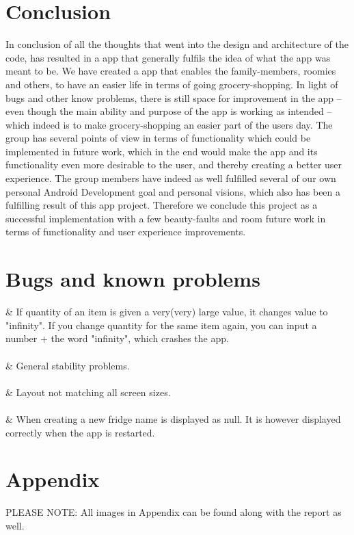 \documentclass[12pt]{article}
\begin{document}
\section{Conclusion}
In conclusion of all the thoughts that went into the design and architecture of the code, has resulted in a app that generally fulfils the idea of what the app was meant to be. We have created a app that enables the family-members, roomies and others, to have an easier life in terms of going grocery-shopping. In light of bugs and other know problems, there is still space for improvement in the app – even though the main ability and purpose of the app is working as intended – which indeed is to make grocery-shopping an easier part of the users day. The group has several points of view in terms of functionality which could be implemented in future work, which in the end would make the app and its functionality even more desirable to the user, and thereby creating a better user experience. The group members have indeed as well fulfilled several of our own personal Android Development goal and personal visions, which also has been a fulfilling result of this app project. Therefore we conclude this project as a successful implementation with a few beauty-faults and room future work in terms of functionality and user experience improvements.

\section{Bugs and known problems}

\begin{easylist}
	& If quantity of an item is given a very(very) large value, it changes value to "infinity". If you change quantity for the same item again, you can input a number + the word "infinity", which crashes the app.
	\\
	\\	
	& General stability problems.
	\\
	\\
	& Layout not matching all screen sizes.
	\\
	\\
	& When creating a new fridge name is displayed as null. It is however displayed correctly when the app is restarted.
\end{easylist}

\newpage

\section{Appendix}
PLEASE NOTE: All images in Appendix can be found along with the report as well.
\end{document}
